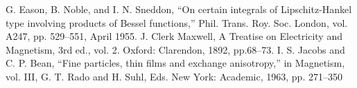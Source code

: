 \documentclass{article}
\begin{document}
\begin{thebibliography}{00}
 G. Eason, B. Noble, and I. N. Sneddon, ``On certain integrals of Lipschitz-Hankel type involving products of Bessel functions,'' Phil. Trans. Roy. Soc. London, vol. A247, pp. 529--551, April 1955.
 J. Clerk Maxwell, A Treatise on Electricity and Magnetism, 3rd ed., vol. 2. Oxford: Clarendon, 1892, pp.68--73.
 I. S. Jacobs and C. P. Bean, ``Fine particles, thin films and exchange anisotropy,'' in Magnetism, vol. III, G. T. Rado and H. Suhl, Eds. New York: Academic, 1963, pp. 271--350
\end{thebibliography}
\end{document}
